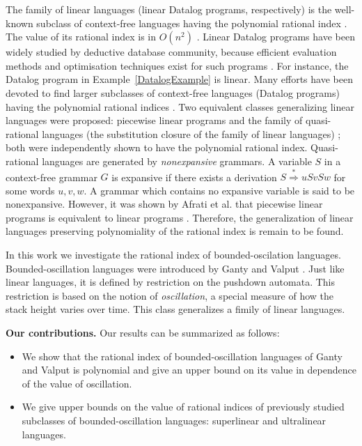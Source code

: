 \documentclass{ws-ijfcs}
\begin{document}
The family of linear languages (linear Datalog programs, respectively) is the well-known subclass of context-free languages having the polynomial rational index \cite{RatBasic, Ullman}. The value of its rational index is in $O(n^2)$ \cite{RatBasic}. Linear Datalog programs have been widely studied by deductive database community, because efficient evaluation methods and optimisation techniques exist for such programs \cite{linearisability, linopt, Ullman}. For instance, the Datalog program in Example~\ref{DatalogExample} is linear. Many efforts have been devoted to find larger subclasses of context-free languages (Datalog programs) having the polynomial rational indices \cite{ChainQ, linearisability, RatBasic, KanellakisParallel, Regularrealizability, Ullman, VyalyiRR}.  Two equivalent classes generalizing linear languages were proposed: piecewise linear programs \cite{KanellakisParallel, Ullman} and the family of quasi-rational languages (the substitution closure of the family of linear languages) \cite{RatBasic}; both were independently shown to have the polynomial rational index. Quasi-rational languages are generated by \textit{nonexpansive} grammars. A variable $S$ in a context-free grammar $G$ is expansive if there exists a derivation $S  \stackrel {*}{\Rightarrow } uSvSw$ for some words $u, v, w$. A grammar which contains no expansive variable is said to be nonexpansive. However, it was shown by Afrati et al. that piecewise linear programs is equivalent to linear programs \cite{linearisability}. Therefore, the generalization of linear languages preserving polynomiality of the rational index is remain to be found.


In this work we investigate the rational index of  bounded-oscilation languages. Bounded-oscillation languages were introduced by Ganty and Valput \cite{BoundOsc}. Just like linear languages, it is defined by restriction on the pushdown automata. This restriction is based on the notion of \textit{oscillation}, a special measure of how the stack height varies over time. This class generalizes a fimily of linear languages.


\textbf{Our contributions.} Our results can be summarized as follows:
\begin{itemize}
\item We show that the rational index of bounded-oscillation languages of Ganty and Valput \cite{BoundOsc} is polynomial and give an upper bound on its value in dependence of the value of oscillation.
\item We give upper bounds on the value of rational indices of previously studied subclasses of bounded-oscillation languages: superlinear and ultralinear languages.
\end{itemize}


\end{document}
